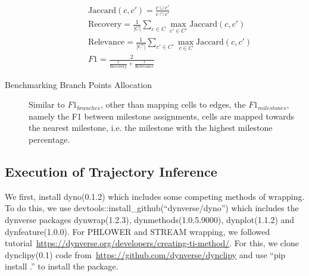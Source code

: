 \begin{description}
	\begin{equation}
	\label{eqn:corrdist}
	\begin{aligned}
	& \text{Jaccard}(c, c')  = \frac{c\cup c'}{c\cap c'} \\
	& \text{Recovery} = \frac{1}{|C|}\sum_{c\in C} \max_{c'\in C'} \text{Jaccard}(c, c') \\
	& \text{Relevance} = \frac{1}{|C'|}\sum_{c' \in C'} \max_{c\in C} \text{Jaccard}(c, c')\\
	& F1 = \frac{2}{\frac{1}{\text{Recovery}} + \frac{1}{\text{Relevance}}}
	\end{aligned}
	\end{equation}

	\item[Benchmarking Branch Points Allocation]
	Similar to $F1_{branches}$, other than mapping cells to edges, the $F1_{milestones}$, namely the F1 between milestone assignments, cells are mapped towards the nearest milestone, i.e. the milestone with the highest milestone percentage.
\end{description}


\subsection{Execution of Trajectory Inference}
\label{chapter:PHLOWER_bench:exe}
We first, install dyno(0.1.2) which includes some competing methods of wrapping. To do this, we use devtools::install\_github(``dynverse/dyno'') which includes the dynverse packages dynwrap(1.2.3),  dynmethods(1.0.5.9000), dynplot(1.1.2) and dynfeature(1.0.0). For PHLOWER and STREAM wrapping, we followed tutorial~\url{https://dynverse.org/developers/creating-ti-method/}. For this, we clone dynclipy(0.1) code from~\url{https://github.com/dynverse/dynclipy} and use ``pip install .'' to install the package.

